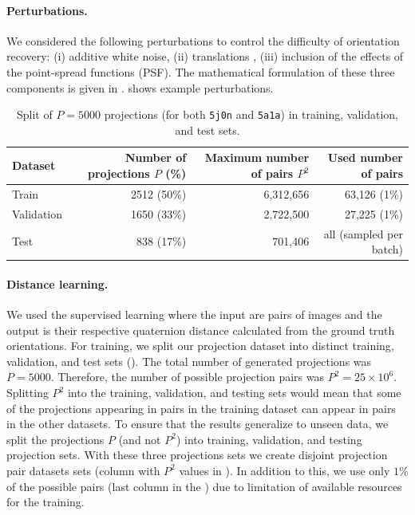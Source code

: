 \paragraph{Perturbations.}
We considered the following perturbations to control the difficulty of orientation recovery: (i) additive white noise, (ii) translations , (iii) inclusion of the effects of the point-spread functions (PSF).
The mathematical formulation of these three components is given in .
 shows example perturbations.

\begin{table}[ht!]
    \centering
    \begin{tabular}{lrrr}
        \toprule
        Dataset & Number of projections $P$ (\%) & Maximum number of pairs $P^2$ & Used number of pairs \\
        \midrule
        Train & 2512 (50\%) & 6,312,656 & 63,126 (1\%) \\
        Validation & 1650 (33\%) & 2,722,500 & 27,225 (1\%) \\
        Test & 838 (17\%) & 701,406 & all (sampled per batch) \\
        \bottomrule
    \end{tabular}
    \caption{
        Split of $P=5000$ projections (for both \texttt{5j0n} and \texttt{5a1a}) in training, validation, and test sets.
    }\label{tab:dataset}
\end{table}

\paragraph{Distance learning.}
We used the supervised learning where the input are pairs of images and the output is their respective quaternion distance calculated from the ground truth orientations.
For training, we split our projection dataset into distinct training, validation, and test sets ().
The total number of generated projections was $P = 5000$.
Therefore, the number of possible projection pairs was $P^2 = 25 \times 10^6$.
Splitting $P^2$ into the training, validation, and testing sets would mean that some of the projections appearing in pairs in the training dataset can appear in pairs in the other datasets.
To ensure that the results generalize to unseen data, we split the projections $P$ (and not $P^2$) into training, validation, and testing projection sets.
With these three projections sets we create disjoint projection pair datasets sets (column with $P^2$ values in ).
In addition to this, we use only $1\%$ of the possible pairs (last column in the ) due to limitation of available resources for the training.

